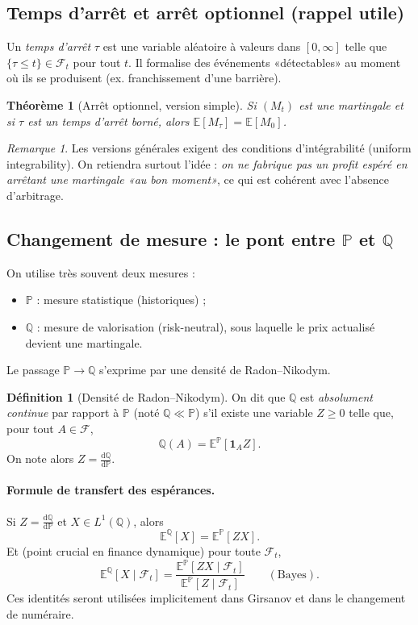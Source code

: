 \documentclass[11pt,a4paper]{report}
\theoremstyle{definition}
\newtheorem{definition}{Définition}[chapter]
\theoremstyle{plain}
\newtheorem{theorem}{Théorème}[chapter]
\theoremstyle{remark}
\newtheorem{remark}{Remarque}[chapter]
\newcommand{\dd}{\mathrm{d}}
\newcommand{\E}{\mathbb{E}}
\newcommand{\1}{\mathbf{1}}
\newcommand{\Pmeas}{\mathbb{P}}
\newcommand{\Qmeas}{\mathbb{Q}}
\newcommand{\F}{\mathcal{F}}
\begin{document}
\subsection*{Temps d'arrêt et arrêt optionnel (rappel utile)}
Un \emph{temps d'arrêt} $\tau$ est une variable aléatoire à valeurs dans $[0,\infty]$ telle que $\{\tau\le t\}\in \F_t$ pour tout $t$.
Il formalise des événements «détectables» au moment où ils se produisent (ex. franchissement d'une barrière).

\begin{theorem}[Arrêt optionnel, version simple]
Si $(M_t)$ est une martingale et si $\tau$ est un temps d'arrêt borné, alors $\E[M_\tau]=\E[M_0]$.
\end{theorem}

\begin{remark}
Les versions générales exigent des conditions d'intégrabilité (uniform integrability). On retiendra surtout l'idée : \emph{on ne fabrique pas un profit espéré en arrêtant une martingale «au bon moment»}, ce qui est cohérent avec l'absence d'arbitrage.
\end{remark}

\subsection*{Changement de mesure : le pont entre $\Pmeas$ et $\Qmeas$}
On utilise très souvent deux mesures :
\begin{itemize}[leftmargin=*]
\item $\Pmeas$ : mesure statistique (historiques) ;
\item $\Qmeas$ : mesure de valorisation (risk-neutral), sous laquelle le prix actualisé devient une martingale.
\end{itemize}
Le passage $\Pmeas\to\Qmeas$ s'exprime par une densité de Radon--Nikodym.

\begin{definition}[Densité de Radon--Nikodym]
On dit que $\Qmeas$ est \emph{absolument continue} par rapport à $\Pmeas$ (noté $\Qmeas\ll\Pmeas$) s'il existe une variable $Z\ge 0$ telle que, pour tout $A\in\F$,
\[
\Qmeas(A)=\E^{\Pmeas}[\1_A Z].
\]
On note alors $Z=\frac{\dd\Qmeas}{\dd\Pmeas}$.
\end{definition}

\paragraph{Formule de transfert des espérances.}
Si $Z=\frac{\dd\Qmeas}{\dd\Pmeas}$ et $X\in L^1(\Qmeas)$, alors
\[
\E^{\Qmeas}[X]=\E^{\Pmeas}[ZX].
\]
Et (point crucial en finance dynamique) pour toute $\F_t$,
\[
\E^{\Qmeas}[X\mid \F_t]=\frac{\E^{\Pmeas}[ZX\mid \F_t]}{\E^{\Pmeas}[Z\mid \F_t]}\qquad (\text{Bayes}).
\]
Ces identités seront utilisées implicitement dans Girsanov et dans le changement de numéraire.
\end{document}
